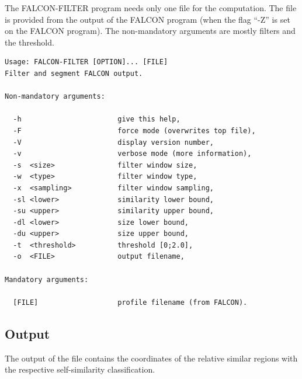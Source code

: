 \documentclass[11pt,journal,compsoc]{report}[1]
\begin{document}
The FALCON-FILTER program needs only one file for the computation. The
file is provided from the output of the FALCON program (when the flag
``-Z'' is set on the FALCON program). The non-mandatory arguments are
mostly filters and the threshold.
\begin{lstlisting}
Usage: FALCON-FILTER [OPTION]... [FILE]                                  
Filter and segment FALCON output.                                        
                                                                         
Non-mandatory arguments:                                                 
                                                                         
  -h                       give this help,                               
  -F                       force mode (overwrites top file),             
  -V                       display version number,                       
  -v                       verbose mode (more information),              
  -s  <size>               filter window size,                           
  -w  <type>               filter window type,                           
  -x  <sampling>           filter window sampling,                       
  -sl <lower>              similarity lower bound,                       
  -su <upper>              similarity upper bound,                       
  -dl <lower>              size lower bound,                             
  -du <upper>              size upper bound,                             
  -t  <threshold>          threshold [0;2.0],                            
  -o  <FILE>               output filename,                              
                                                                         
Mandatory arguments:                                                     
                                                                         
  [FILE]                   profile filename (from FALCON).
\end{lstlisting}

\subsection*{Output}

The output of the file contains the coordinates of the relative
similar regions with the respective self-similarity classification.



\end{document}
